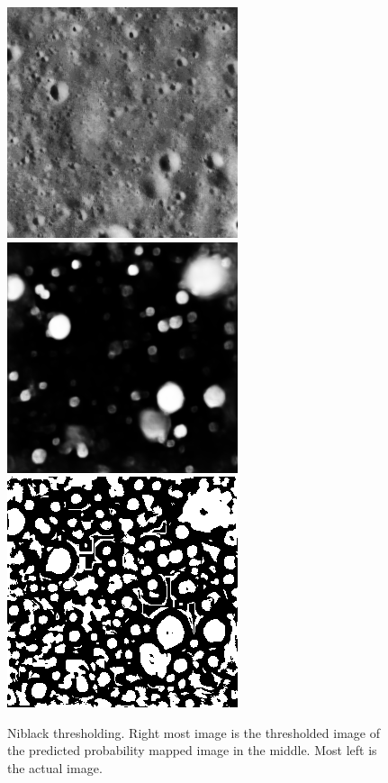\documentclass[11pt]{article}
\begin{document}
\begin{figure}[H]
	\includegraphics[width=.3\textwidth]{files/results/26.png}\hfill
	\includegraphics[width=.3\textwidth]{files/results/26_predict.png}\hfill
	\includegraphics[width=.3\textwidth]{files/results/niblack.png}
	\caption{Niblack thresholding. Right most image is the thresholded image of the predicted probability mapped image in the middle. Most left is the actual image.}
	\label{Niblack_th}
\end{figure}
\end{document}
